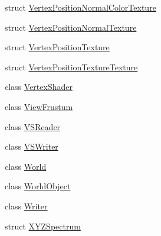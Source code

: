\begin{DoxyCompactItemize}
\item 
struct \hyperlink{structmage_1_1_vertex_position_normal_color_texture}{Vertex\+Position\+Normal\+Color\+Texture}
\item 
struct \hyperlink{structmage_1_1_vertex_position_normal_texture}{Vertex\+Position\+Normal\+Texture}
\item 
struct \hyperlink{structmage_1_1_vertex_position_texture}{Vertex\+Position\+Texture}
\item 
struct \hyperlink{structmage_1_1_vertex_position_texture_texture}{Vertex\+Position\+Texture\+Texture}
\item 
class \hyperlink{classmage_1_1_vertex_shader}{Vertex\+Shader}
\item 
class \hyperlink{classmage_1_1_view_frustum}{View\+Frustum}
\item 
class \hyperlink{classmage_1_1_v_s_reader}{V\+S\+Reader}
\item 
class \hyperlink{classmage_1_1_v_s_writer}{V\+S\+Writer}
\item 
class \hyperlink{classmage_1_1_world}{World}
\item 
class \hyperlink{classmage_1_1_world_object}{World\+Object}
\item 
class \hyperlink{classmage_1_1_writer}{Writer}
\item 
struct \hyperlink{structmage_1_1_x_y_z_spectrum}{X\+Y\+Z\+Spectrum}
\end{DoxyCompactItemize}
